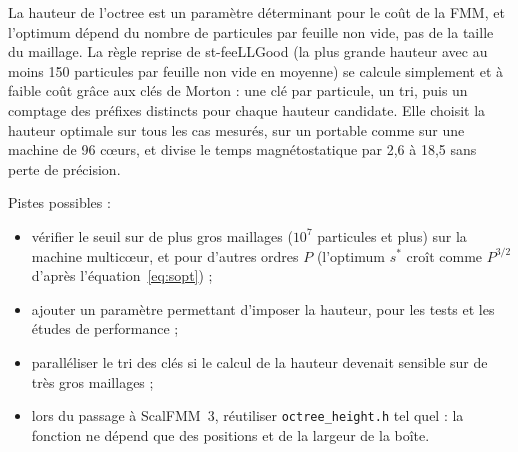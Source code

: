 \documentclass[11pt,a4paper]{article}
\newcommand{\code}[1]{\texttt{#1}}
\begin{document}
La hauteur de l'octree est un paramètre déterminant pour le coût de la FMM, et l'optimum dépend
du nombre de particules par feuille non vide, pas de la taille du maillage. La règle reprise de
st-feeLLGood (la plus grande hauteur avec au moins 150 particules par feuille non vide en moyenne)
se calcule simplement et à faible coût grâce aux clés de Morton : une clé par particule, un tri,
puis un comptage des préfixes distincts pour chaque hauteur candidate. Elle choisit la hauteur
optimale sur tous les cas mesurés, sur un portable comme sur une machine de 96 cœurs, et divise le
temps magnétostatique par 2,6 à 18,5 sans perte de précision.

Pistes possibles :
\begin{itemize}
  \item vérifier le seuil sur de plus gros maillages ($10^7$ particules et plus) sur la machine
        multicœur, et pour d'autres ordres $P$ (l'optimum $s^\ast$ croît comme $P^{3/2}$ d'après
        l'équation~\eqref{eq:sopt}) ;
  \item ajouter un paramètre permettant d'imposer la hauteur, pour les tests et les études de
        performance ;
  \item paralléliser le tri des clés si le calcul de la hauteur devenait sensible sur de très
        gros maillages ;
  \item lors du passage à ScalFMM~3, réutiliser \code{octree\_height.h} tel quel : la
        fonction ne dépend que des positions et de la largeur de la boîte.
\end{itemize}
\end{document}
